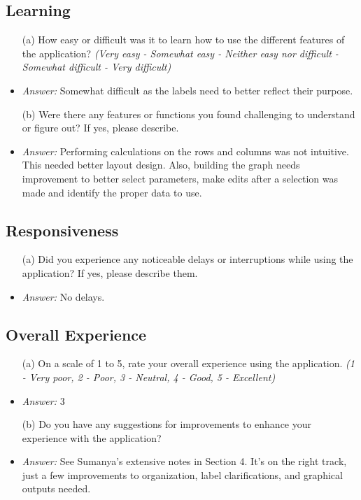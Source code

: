 \documentclass{article}
\begin{document}
\subsection*{\textbf{Learning}}
  \begin{itemize}
    \item[(a)] How easy or difficult was it to learn how to use the different
    features of the application? \textit{(Very easy - Somewhat easy - Neither
    easy nor difficult - Somewhat difficult - Very difficult)}
    \item \emph{Answer:} Somewhat difficult as the labels need to better reflect their purpose.
    \item[(b)] Were there any features or functions you found challenging to
    understand or figure out? If yes, please describe. 
    \item \emph{Answer:} Performing calculations on the rows and columns was not intuitive. This needed 
    better layout design. Also, building the graph needs improvement to better select parameters, make 
    edits after a selection was made and identify the proper data to use.
  \end{itemize}

\subsection*{\textbf{Responsiveness}}
  \begin{itemize}
    \item[(a)] Did you experience any noticeable delays or interruptions while
    using the application? If yes, please describe them.
    \item \emph{Answer:} No delays.
  \end{itemize}

\subsection*{\textbf{Overall Experience}}
  \begin{itemize}
    \item[(a)] On a scale of 1 to 5, rate your overall experience using the
    application. \textit{(1 - Very poor, 2 - Poor, 3 - Neutral, 4 - Good, 5 -
    Excellent)}
    \item \emph{Answer:} 3
    \item[(b)] Do you have any suggestions for improvements to enhance your
    experience with the application?
    \item \emph{Answer:} See Sumanya's extensive notes in Section 4. It's on the right track, just a 
    few improvements to organization, label clarifications, and graphical outputs needed.
  \end{itemize}
\end{document}

